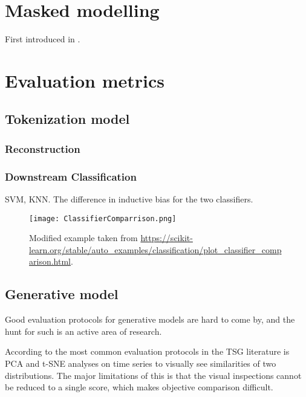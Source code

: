 \documentclass[../../thesis.tex]{subfiles}
\begin{document}


\section{Masked modelling}
First introduced in \cite{devlin2019bert}. \newline



\section{Evaluation metrics}

\subsection{Tokenization model}

\subsubsection{Reconstruction}


\subsubsection{Downstream Classification}

SVM, KNN. The difference in inductive bias for the two classifiers. 


\begin{figure}[h]
    \label{fig:ClassifierComparrison}
    \texttt{[image: ClassifierComparrison.png]}
    \centering
    \caption{Modified example taken from \url{https://scikit-learn.org/stable/auto_examples/classification/plot_classifier_comparison.html}.}
\end{figure}

\subsection{Generative model}
Good evaluation protocols for generative models are hard to come by, and the hunt for such is an active area of research. \newline


According to \cite{TimeVQVAE} the most common evaluation protocols in the TSG literature is PCA and t-SNE analyses on time series to visually see similarities of two distributions. The major limitations of this is that the visual inspections cannot be reduced to a single score, which makes objective comparison difficult. \newline
\end{document}
